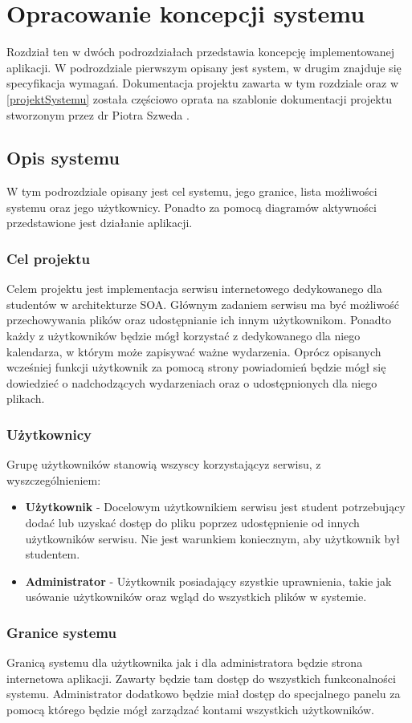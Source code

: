 \chapter{Opracowanie koncepcji systemu}
\label{cha:koncepcjaSystemu}
Rozdział ten w dwóch podrozdziałach przedstawia koncepcję implementowanej aplikacji. W podrozdziale pierwszym opisany jest system, w drugim znajduje się specyfikacja wymagań. Dokumentacja projektu zawarta w tym rozdziale oraz w \ref{projektSystemu} została częściowo oprata na szablonie dokumentacji projektu stworzonym przez dr Piotra Szweda \cite{DOC01}.
\section{Opis systemu}
W tym podrozdziale opisany jest cel systemu, jego granice, lista możliwości systemu oraz jego użytkownicy. Ponadto za pomocą diagramów aktywności przedstawione jest działanie aplikacji.
\subsection{Cel projektu}
Celem projektu jest implementacja serwisu internetowego dedykowanego dla studentów w architekturze SOA. Głównym zadaniem serwisu ma być możliwość przechowywania plików oraz udostępnianie ich innym użytkownikom. Ponadto każdy z użytkowników będzie mógł korzystać z dedykowanego dla niego kalendarza, w którym może zapisywać ważne wydarzenia. Oprócz opisanych wcześniej funkcji użytkownik za pomocą strony powiadomień będzie mógł się dowiedzieć o nadchodzących wydarzeniach oraz o udostępnionych dla niego plikach.

\subsection{Użytkownicy}
Grupę użytkowników stanowią wszyscy korzystającyz serwisu, z wyszczególnieniem:
\begin{itemize}
	\item \textbf{Użytkownik} - Docelowym użytkownikiem serwisu jest student potrzebujący dodać lub uzyskać dostęp do pliku poprzez udostępnienie od innych użytkowników serwisu. Nie jest warunkiem koniecznym, aby użytkownik był studentem.
	\item \textbf{Administrator} - Użytkownik posiadający szystkie uprawnienia, takie jak usówanie użytkowników oraz wgląd do wszystkich plików w systemie.
\end{itemize}

\subsection{Granice systemu}
Granicą systemu dla użytkownika jak i dla administratora będzie strona internetowa aplikacji. Zawarty będzie tam dostęp do wszystkich funkconalności systemu. Administrator dodatkowo będzie miał dostęp do specjalnego panelu za pomocą którego będzie mógł zarządzać kontami wszystkich użytkowników.

